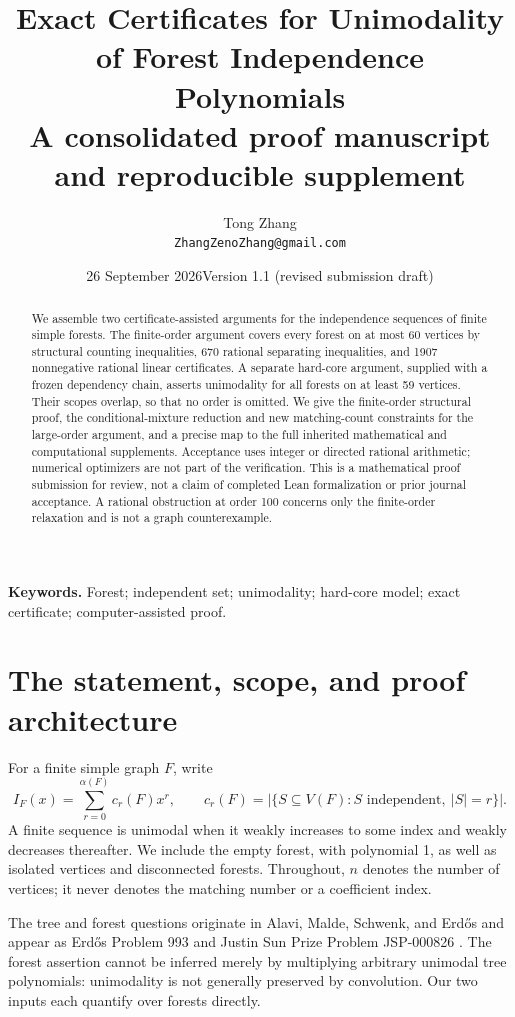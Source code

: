 \documentclass[11pt,a4paper]{article}
\title{Exact Certificates for Unimodality of Forest Independence Polynomials\\[3mm]\large A consolidated proof manuscript and reproducible supplement}
\author{Tong Zhang\\\small\texttt{ZhangZenoZhang@gmail.com}}
\date{26 September 2026\quad Version 1.1 (revised submission draft)}
\theoremstyle{definition}\newtheorem{definition}[theorem]{Definition}
\theoremstyle{remark}\newtheorem{remark}[theorem]{Remark}
\begin{document}
\maketitle
\begin{abstract}
We assemble two certificate-assisted arguments for the independence sequences of finite simple forests. The finite-order argument covers every forest on at most 60 vertices by structural counting inequalities, 670 rational separating inequalities, and 1907 nonnegative rational linear certificates. A separate hard-core argument, supplied with a frozen dependency chain, asserts unimodality for all forests on at least 59 vertices. Their scopes overlap, so that no order is omitted. We give the finite-order structural proof, the conditional-mixture reduction and new matching-count constraints for the large-order argument, and a precise map to the full inherited mathematical and computational supplements. Acceptance uses integer or directed rational arithmetic; numerical optimizers are not part of the verification. This is a mathematical proof submission for review, not a claim of completed Lean formalization or prior journal acceptance. A rational obstruction at order 100 concerns only the finite-order relaxation and is not a graph counterexample.
\end{abstract}
\noindent\textbf{Keywords.} Forest; independent set; unimodality; hard-core model; exact certificate; computer-assisted proof.

\section{The statement, scope, and proof architecture}\label{sec:scope}
For a finite simple graph $F$, write
\[
 I_F(x)=\sum_{r=0}^{\alpha(F)}c_r(F)x^r,
 \qquad c_r(F)=|\{S\subseteq V(F): S\text{ independent},\ |S|=r\}|.
\]
A finite sequence is unimodal when it weakly increases to some index and weakly decreases thereafter. We include the empty forest, with polynomial 1, as well as isolated vertices and disconnected forests. Throughout, $n$ denotes the number of vertices; it never denotes the matching number or a coefficient index.

The tree and forest questions originate in Alavi, Malde, Schwenk, and Erd\H{o}s \cite{alavi} and appear as Erd\H{o}s Problem 993 and Justin Sun Prize Problem JSP-000826 \cite{erdos,jsp}. The forest assertion cannot be inferred merely by multiplying arbitrary unimodal tree polynomials: unimodality is not generally preserved by convolution. Our two inputs each quantify over forests directly.
\end{document}
